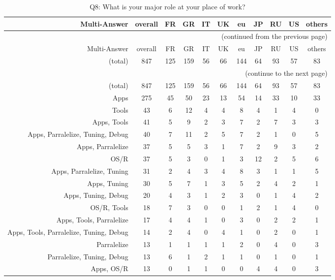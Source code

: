\clearpage%
{\footnotesize\begin{landscape}%
\begin{longtable}[htb]{r|c|c|c|c|c|c|c|c|c|c}%
\caption{Q8: What is your major role at your place of work?}%
\label{tab:Q8-mans} \\%
\hline%
Multi-Answer & overall & FR & GR & IT & UK & eu & JP & RU & US & others \\
 \hline%
\endfirsthead%
\multicolumn{11}{r}{(continued from the previous page)}\\%
\hline%
Multi-Answer & overall & FR & GR & IT & UK & eu & JP & RU & US & others \\
 \hline%
\endhead%
\hline%
(total) & 847 & 125 & 159 & 56 & 66 & 144 & 64 & 93 & 57 & 83 \\%
\hline%
\multicolumn{11}{r}{(continue to the next page)}\\%
\endfoot%
\hline%
(total) & 847 & 125 & 159 & 56 & 66 & 144 & 64 & 93 & 57 & 83 \\%
\hline%
\endlastfoot%
\hline%
{Apps} & 275 & 45 & 50 & 23 & 13 & 54 & 14 & 33 & 10 & 33 \\%
{Tools} & 43 & 6 & 12 & 4 & 4 & 8 & 4 & 1 & 4 & 0 \\%
{Apps, Tools} & 41 & 5 & 9 & 2 & 3 & 7 & 2 & 7 & 3 & 3 \\%
{Apps, Parralelize, Tuning, Debug} & 40 & 7 & 11 & 2 & 5 & 7 & 2 & 1 & 0 & 5 \\%
{Apps, Parralelize} & 37 & 5 & 5 & 3 & 1 & 7 & 2 & 9 & 3 & 2 \\%
{OS/R} & 37 & 5 & 3 & 0 & 1 & 3 & 12 & 2 & 5 & 6 \\%
{Apps, Parralelize, Tuning} & 31 & 2 & 4 & 3 & 4 & 8 & 3 & 1 & 1 & 5 \\%
{Apps, Tuning} & 30 & 5 & 7 & 1 & 3 & 5 & 2 & 4 & 2 & 1 \\%
{Apps, Tuning, Debug} & 20 & 4 & 3 & 1 & 2 & 3 & 0 & 1 & 4 & 2 \\%
{OS/R, Tools} & 18 & 7 & 3 & 0 & 0 & 1 & 2 & 1 & 4 & 0 \\%
{Apps, Tools, Parralelize} & 17 & 4 & 4 & 1 & 0 & 3 & 0 & 2 & 2 & 1 \\%
{Apps, Tools, Parralelize, Tuning, Debug} & 14 & 2 & 4 & 0 & 4 & 1 & 0 & 2 & 0 & 1 \\%
{Parralelize} & 13 & 1 & 1 & 1 & 1 & 2 & 0 & 4 & 0 & 3 \\%
{Parralelize, Tuning, Debug} & 13 & 6 & 1 & 2 & 1 & 1 & 0 & 1 & 0 & 1 \\%
{Apps, OS/R} & 13 & 0 & 1 & 1 & 0 & 0 & 4 & 4 & 0 & 3 \\%

\end{longtable}
\end{landscape}}
